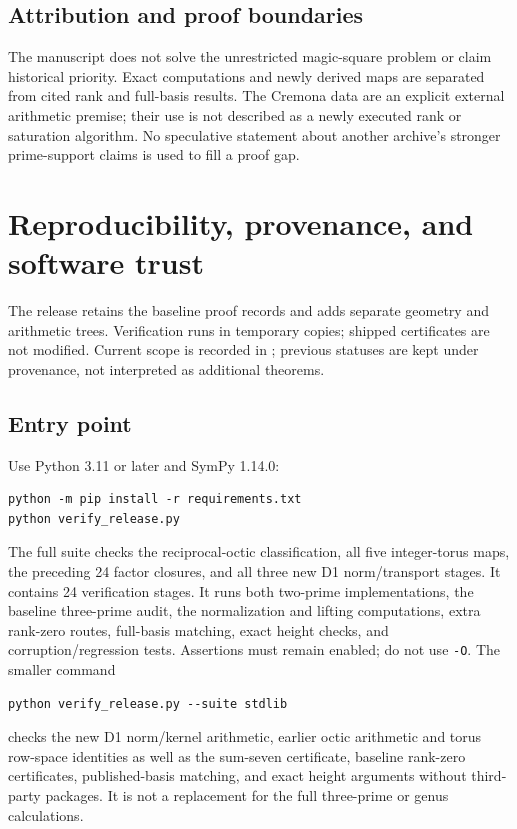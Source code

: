 \documentclass[11pt,letterpaper]{article}
\theoremstyle{definition}\newtheorem{definition}[theorem]{Definition}
\theoremstyle{remark}\newtheorem{remark}[theorem]{Remark}
\begin{document}
\subsection{Attribution and proof boundaries}
The manuscript does not solve the unrestricted magic-square problem or claim historical priority. Exact computations and newly derived maps are separated from cited rank and full-basis results. The Cremona data are an explicit external arithmetic premise; their use is not described as a newly executed rank or saturation algorithm. No speculative statement about another archive's stronger prime-support claims is used to fill a proof gap.

\section{Reproducibility, provenance, and software trust}\label{sec:repro}
The release retains the baseline proof records and adds separate geometry and arithmetic trees. Verification runs in temporary copies; shipped certificates are not modified. Current scope is recorded in ; previous statuses are kept under provenance, not interpreted as additional theorems.

\subsection{Entry point}
Use Python 3.11 or later and SymPy 1.14.0:
\begin{verbatim}
python -m pip install -r requirements.txt
python verify_release.py
\end{verbatim}
The full suite checks the reciprocal-octic classification, all five integer-torus maps, the preceding 24 factor closures, and all three new D1 norm/transport stages. It contains 24 verification stages. It runs both two-prime implementations, the baseline three-prime audit, the normalization and lifting computations, extra rank-zero routes, full-basis matching, exact height checks, and corruption/regression tests. Assertions must remain enabled; do not use \texttt{-O}. The smaller command
\begin{verbatim}
python verify_release.py --suite stdlib
\end{verbatim}
checks the new D1 norm/kernel arithmetic, earlier octic arithmetic and torus row-space identities as well as the sum-seven certificate, baseline rank-zero certificates, published-basis matching, and exact height arguments without third-party packages. It is not a replacement for the full three-prime or genus calculations.
\end{document}
